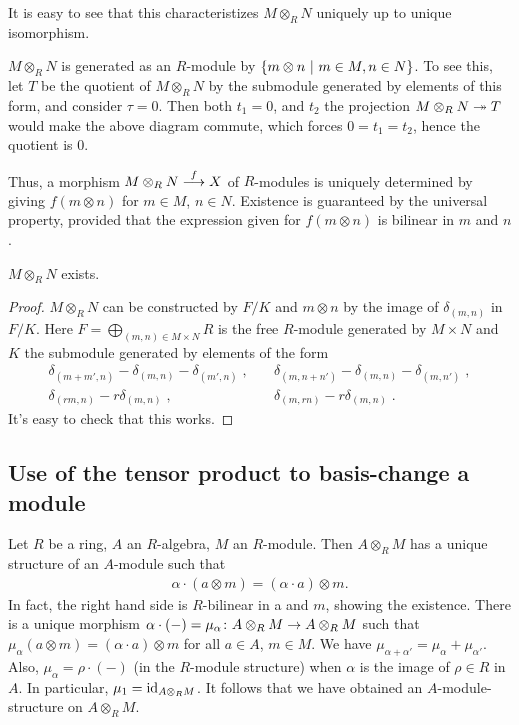 \documentclass[a4paper,parskip=half,numbers=enddot, DIV=12]{scrreprt}
\begin{document}
\begin{rem}
    \begin{alphanumerate}
        \item 
            It is easy to see that this characteristizes $M\otimes_R N$ uniquely up to unique isomorphism.
        \item 
            $M\otimes_R N$ is generated as an $R$-module by $\left\{m\otimes n \ \middle|\  m\in M, n\in N\right\}$. To see this, let $T$ be the quotient of $M\otimes_RN$ by the submodule generated by elements of this form, and consider $\tau = 0$. Then both $t_1=0$, and $t_2$ the projection $M\otimes_R N \epimorphism T$ would make the above diagram commute, which forces $0=t_1=t_2$, hence the quotient is $0$. 
            
            Thus, a morphism $M\otimes_R N \morphism[f] X$ of $R$-modules is uniquely determined by giving $f(m\otimes n)$ for $m\in M$, $n\in N$. Existence is guaranteed by the universal property, provided that the expression given for $f(m\otimes n)$ is bilinear in $m$ and $n$.
    \end{alphanumerate}
\end{rem}
\begin{prop}
    $M\otimes_R N$ exists.
\end{prop}
\begin{proof}
    $M\otimes_R N$ can be constructed by $F/K$ and $m\otimes n$ by the image of $\delta_{(m,n)}$ in $F/K$. Here $F=\bigoplus_{(m,n)\in M\times N}R$ is the free $R$-module generated by $M\times N$ and $K$ the submodule generated by elements of the form 
    \begin{align*}
        \delta_{(m+m',n)}-\delta_{(m,n)}-\delta_{(m',n)}\;,\quad&\delta_{(m,n+n')}-\delta_{(m,n)}-\delta_{(m,n')}\;,\\
        \delta_{(rm,n)}-r\delta_{(m,n)}\;,\quad&\delta_{(m,rn)}-r\delta_{(m,n)}\;.
    \end{align*}
    It's easy to check that this works.
\end{proof}
\subsection{Use of the tensor product to basis-change a module}
Let $R$ be a ring, $A$ an $R$-algebra, $M$ an $R$-module. Then $A\otimes_RM$ has a unique structure of an $A$-module such that
\begin{align*}
    \alpha\cdot (a\otimes m) = (\alpha \cdot a)\otimes m.
\end{align*}
In fact, the right hand side is $R$-bilinear in a and $m$, showing the existence. There is a unique morphism $\alpha\cdot(-) = \mu_\alpha\colon A\otimes_R M \morphism A\otimes_R M$ such that $\mu_\alpha(a\otimes m) = (\alpha\cdot a) \otimes m$ for all $a\in A$, $m\in M$. We have $\mu_{\alpha+\alpha'} = \mu_{\alpha}+\mu_{\alpha'}$. Also, $\mu_\alpha = \rho\cdot(-)$ (in the $R$-module structure) when $\alpha$ is the image of $\rho\in R$ in $A$. In particular, $\mu_1 = \operatorname{id}_{A\otimes_R M}$. It follows that we have obtained an $A$-module-structure on $A\otimes_R M$.
\end{document}
